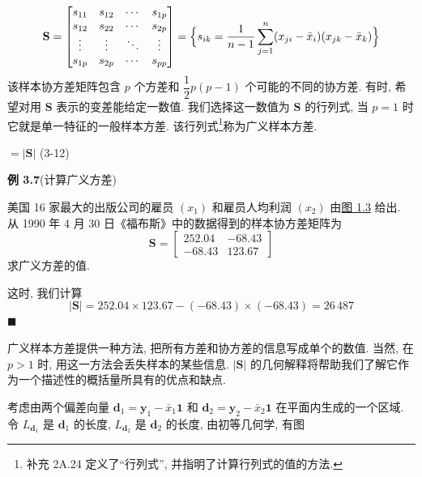 \[
\mathbf{S}=\begin{bmatrix}
s_{11}&s_{12}&\cdots&s_{1p}\\
s_{12}&s_{22}&\cdots&s_{2p}\\
\vdots&\vdots&\ddots&\vdots\\
s_{1p}&s_{2p}&\cdots&s_{pp}
\end{bmatrix}
=\Bigl\{s_{ik}=\frac{1}{n-1}\sum_{j=1}^{n}(x_{ji}-\bar{x}_{i})(x_{jk}-\bar{x}_{k})\Bigr\}
\]
该样本协方差矩阵包含 $p$ 个方差和 $\dfrac{1}{2}p(p-1)$ 个可能的不同的协方差. 有时, 希望对用 $\mathbf{S}$ 表示的变差能给定一数值. 我们选择这一数值为 $\mathbf{S}$ 的行列式, 当 $p=1$ 时它就是单一特征的一般样本方差. 该行列式\footnote{{\footnotesize 补充 2A.24 定义了“行列式”, 并指明了计算行列式的值的方法.}}称为广义样本方差.

\begin{mvbox}
\centering
{} $=|\mathbf{S}|$ \hspace{3em} (3-12)
\end{mvbox}

\medskip
\noindent\textbf{例 3.7}\quad (计算广义方差)

美国 16 家最大的出版公司的雇员 $(x_{1})$ 和雇员人均利润 $(x_{2})$ 由\hyperref[fig:1.3]{图 1.3} 给出. 从 1990 年 4 月 30 日《福布斯》中的数据得到的样本协方差矩阵为
\[
\mathbf{S}=\begin{bmatrix}252.04&-68.43\\-68.43&123.67\end{bmatrix}
\]
求广义方差的值.

这时, 我们计算
\[
|\mathbf{S}|=252.04\times123.67-(-68.43)\times(-68.43)=26\,487
\]
\hfill$\blacksquare$

广义样本方差提供一种方法, 把所有方差和协方差的信息写成单个的数值. 当然, 在 $p>1$ 时, 用这一方法会丢失样本的某些信息. $|\mathbf{S}|$ 的几何解释将帮助我们了解它作为一个描述性的概括量所具有的优点和缺点.

考虑由两个偏差向量 $\mathbf{d}_{1}=\mathbf{y}_{1}-\bar{x}_{1}\mathbf{1}$ 和 $\mathbf{d}_{2}=\mathbf{y}_{2}-\bar{x}_{2}\mathbf{1}$ 在平面内生成的一个区域. 令 $L_{\mathbf{d}_{1}}$ 是 $\mathbf{d}_{1}$ 的长度, $L_{\mathbf{d}_{2}}$ 是 $\mathbf{d}_{2}$ 的长度, 由初等几何学, 有图

\begin{center}
\end{center}

